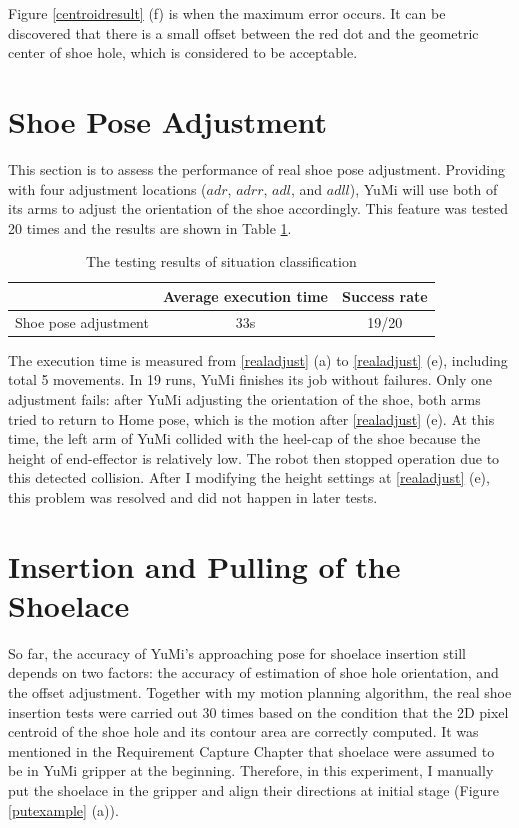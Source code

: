 Figure \ref{centroidresult} (f) is when the maximum error occurs. It can be discovered that there is a small offset between the red dot and the geometric center of shoe hole, which is considered to be acceptable.

\section{Shoe Pose Adjustment}
This section is to assess the performance of real shoe pose adjustment. Providing with four adjustment locations ($adr$, $adrr$, $adl$, and $adll$), YuMi will use both of its arms to adjust the orientation of the shoe accordingly. This feature was tested 20 times and the results are shown in Table \ref{adjusttest}.

\begin{table}[H]
\centering
\begin{tabular}{||c||c|c||}
\hline
 & Average execution time & Success rate \\ \hline \hline
Shoe pose adjustment & 33s & 19/20 \\ \hline
\end{tabular}
\caption{The testing results of situation classification}
\label{adjusttest}
\end{table}

The execution time is measured from \ref{realadjust} (a) to \ref{realadjust} (e), including total 5 movements. In 19 runs, YuMi finishes its job without failures. Only one adjustment fails: after YuMi adjusting the orientation of the shoe, both arms tried to return to Home pose, which is the motion after \ref{realadjust} (e). At this time, the left arm of YuMi collided with the heel-cap of the shoe because the height of end-effector is relatively low. The robot then stopped operation due to this detected collision. After I modifying the height settings at \ref{realadjust} (e), this problem was resolved and did not happen in later tests.


\section{Insertion and Pulling of the Shoelace}
So far, the accuracy of YuMi's approaching pose for shoelace insertion still depends on two factors: the accuracy of estimation of shoe hole orientation, and the offset adjustment. Together with my motion planning algorithm, the real shoe insertion tests were carried out 30 times based on the condition that the 2D pixel centroid of the shoe hole and its contour area are correctly computed. It was mentioned in the Requirement Capture Chapter that shoelace were assumed to be in YuMi gripper at the beginning. Therefore, in this experiment, I manually put the shoelace in the gripper and align their directions at initial stage (Figure \ref{putexample} (a)).

